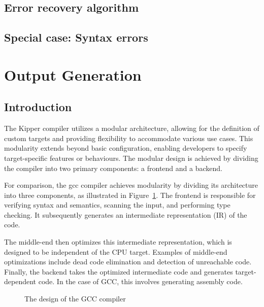 \subsection{Error recovery algorithm}

\subsection{Special case: Syntax errors}

\section{Output Generation}
\label{sec:output-generation}

\subsection{Introduction}

The Kipper compiler utilizes a modular architecture, allowing for the definition of custom targets and providing flexibility to accommodate various use cases. This modularity extends beyond basic configuration, enabling developers to specify target-specific features or behaviours. The modular design is achieved by dividing the compiler into two primary components: a frontend and a backend.

For comparison, the \acrshort{gcc} compiler achieves modularity by dividing its architecture into three components, as illustrated in Figure~\ref{fig:implementation:gcccompiler}. The frontend is responsible for verifying syntax and semantics, scanning the input, and performing type checking. It subsequently generates an intermediate representation (IR) of the code.

The middle-end then optimizes this intermediate representation, which is designed to be independent of the CPU target. Examples of middle-end optimizations include dead code elimination and detection of unreachable code. Finally, the backend takes the optimized intermediate code and generates target-dependent code. In the case of GCC, this involves generating assembly code.

\begin{figure}[h!]
	\centering
	\def\stackalignment{r}
	\caption{The design of the GCC compiler}
	\label{fig:implementation:gcccompiler}
\end{figure}

